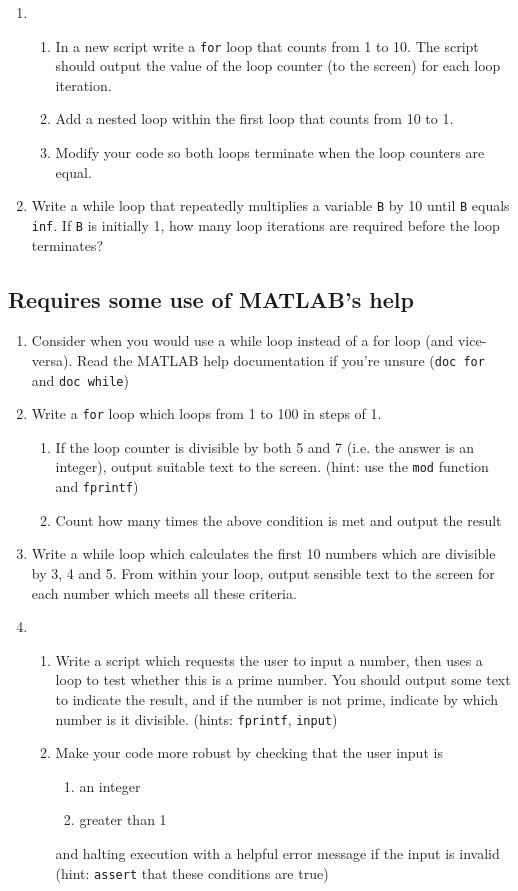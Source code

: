 \documentclass{article}
\begin{document}
\begin{enumerate}
		\item
		\begin{enumerate}
			\item In a new script write a \texttt{for} loop that counts from 1 to 10. The script should output the value of the loop counter (to the screen) for each loop iteration.
			\item Add a nested loop within the first loop that counts from 10 to 1.
			\item Modify your code so both loops terminate when the loop counters are equal.
		\end{enumerate}		
		\item Write a while loop that repeatedly multiplies a variable \texttt{B} by 10 until \texttt{B} equals \texttt{inf}. If \texttt{B} is initially 1, how many loop iterations are required before the loop terminates?
	\end{enumerate}
	\subsection*{Requires some use of MATLAB's help}
	\begin{enumerate}[resume]
		\item Consider when you would use a while loop instead of a for loop (and vice-versa). Read the MATLAB help documentation if you're unsure (\texttt{doc for} and \texttt{doc while})
		\item Write a \texttt{for} loop which loops from 1 to 100 in steps of 1.
		\begin{enumerate}
			\item If the loop counter is divisible by both 5 and 7 (i.e. the answer is an integer), output suitable text to the screen. (hint: use the \texttt{mod} function and \texttt{fprintf})
			\item Count how many times the above condition is met and output the result
		\end{enumerate}
		\item Write a while loop which calculates the first 10 numbers which are divisible by 3, 4 and 5. From within your loop, output sensible text to the screen for each number which meets all these criteria.
		\item
		\begin{enumerate}
			\item  Write a script which requests the user to input a number, then uses a loop to test whether this is a prime number. You should output some text to indicate the result, and if the number is not prime, indicate by which number is it divisible. (hints: \texttt{fprintf}, \texttt{input})
			\item Make your code more robust by checking that the user input is
			\begin{enumerate}
				\item an integer
				\item greater than 1
			\end{enumerate}
			and halting execution with a helpful error message if the input is invalid (hint: \texttt{assert} that these conditions are true)
		\end{enumerate}
	\end{enumerate}
\end{document}
